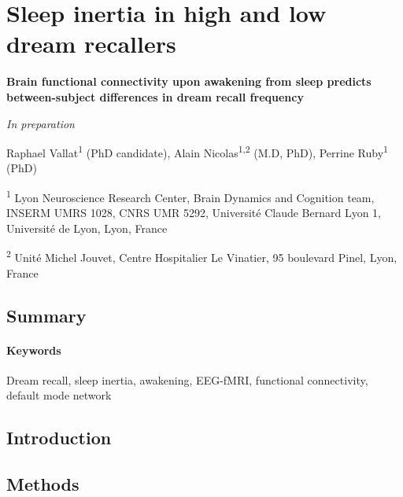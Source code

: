 \section{Sleep inertia in high and low dream recallers}
\label{res:inertia:drf}

\bigskip

\textbf{{\large Brain functional connectivity upon awakening from sleep predicts between-subject differences in dream recall frequency}}

\hfill \emph{In preparation}

\bigskip

Raphael Vallat\textsuperscript{1} (PhD candidate), Alain Nicolas\textsuperscript{1,2} (M.D, PhD), Perrine Ruby\textsuperscript{1} (PhD)

\textsuperscript{1} Lyon Neuroscience Research Center, Brain Dynamics and Cognition team, INSERM UMRS 1028, CNRS UMR 5292, Université Claude Bernard Lyon 1, Université de Lyon, Lyon, France

\textsuperscript{2} Unité Michel Jouvet, Centre Hospitalier Le Vinatier, 95 boulevard Pinel, Lyon, France

\subsection*{Summary}
\label{res:inertia:drf:summary}


\paragraph{Keywords}
Dream recall, sleep inertia, awakening, EEG-fMRI, functional connectivity, default mode network

\subsection*{Introduction}
\label{res:inertia:drf:intro}


\subsection*{Methods}
\label{res:inertia:drf:methods}

